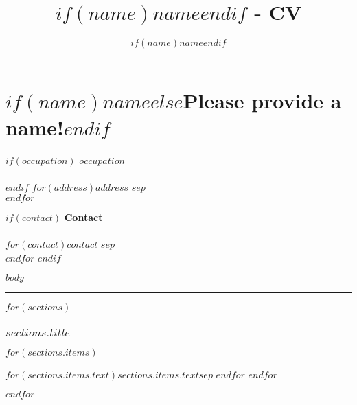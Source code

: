 \documentclass[11pt,a4paper]{scrartcl}
\author{$if(name)$$name$$endif$}
\title{$if(name)$$name$$endif$ - CV}
\begin{document}
\color{TextColor}

\part*{$if(name)$$name$$else$Please provide a name!$endif$}

\begin{minipage}[t]{0.48\textwidth}
$if(occupation)$
\textbf{$occupation$} \\
\\
$endif$
$for(address)$$address$ $sep$ \\$endfor$
\end{minipage}%
\begin{minipage}[t]{0.48\textwidth}
$if(contact)$
  \textbf{Contact} \\
    \\
    $for(contact)$$contact$ $sep$ \\$endfor$
$endif$
\end{minipage}

$body$

{\color{AccentColor}\rule{\linewidth}{0.5mm}}

$for(sections)$
\section*{$sections.title$}

\begin{description}

$for(sections.items)$
\item [$if(sections.items.label)$$sections.items.label$$endif$] $for(sections.items.text)$$sections.items.text$$sep$ \newline $endfor$ 
$endfor$

\end{description}
$endfor$
\end{document}
